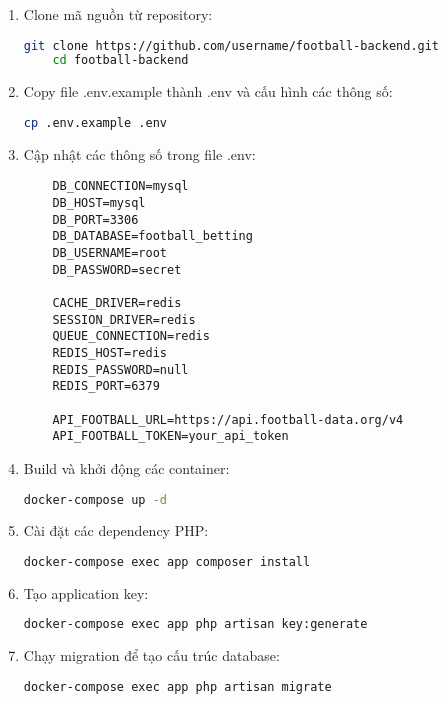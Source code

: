 \documentclass[a4paper,12pt]{report}
\begin{document}
\begin{enumerate}
    \item Clone mã nguồn từ repository:
    \begin{lstlisting}[language=bash]
    git clone https://github.com/username/football-backend.git
    cd football-backend
    \end{lstlisting}

    \item Copy file .env.example thành .env và cấu hình các thông số:
    \begin{lstlisting}[language=bash]
    cp .env.example .env
    \end{lstlisting}

    \item Cập nhật các thông số trong file .env:
    \begin{lstlisting}
    DB_CONNECTION=mysql
    DB_HOST=mysql
    DB_PORT=3306
    DB_DATABASE=football_betting
    DB_USERNAME=root
    DB_PASSWORD=secret

    CACHE_DRIVER=redis
    SESSION_DRIVER=redis
    QUEUE_CONNECTION=redis
    REDIS_HOST=redis
    REDIS_PASSWORD=null
    REDIS_PORT=6379

    API_FOOTBALL_URL=https://api.football-data.org/v4
    API_FOOTBALL_TOKEN=your_api_token
    \end{lstlisting}

    \item Build và khởi động các container:
    \begin{lstlisting}[language=bash]
    docker-compose up -d
    \end{lstlisting}

    \item Cài đặt các dependency PHP:
    \begin{lstlisting}[language=bash]
    docker-compose exec app composer install
    \end{lstlisting}

    \item Tạo application key:
    \begin{lstlisting}[language=bash]
    docker-compose exec app php artisan key:generate
    \end{lstlisting}

    \item Chạy migration để tạo cấu trúc database:
    \begin{lstlisting}[language=bash]
    docker-compose exec app php artisan migrate
    \end{lstlisting}


\end{enumerate}
\end{document}
